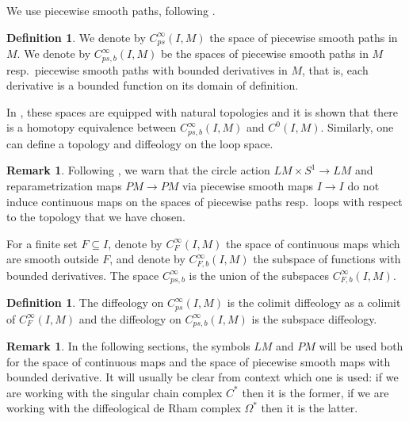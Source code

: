 \documentclass{scrartcl}
\theoremstyle{plain}
\theoremstyle{definition}
\newtheorem{definition}[theorem]{Definition}
\newtheorem{remark}[theorem]{Remark}
\renewcommand{\subset}{\subseteq}
\begin{document}
We use piecewise smooth paths, following \cite{stacey2017smooth}. 
\begin{definition}
    We denote by $C^\infty_{ps}(I, M)$ the space of piecewise smooth paths in $M$. We denote by $C^\infty_{ps, b}(I, M)$ be the spaces of piecewise smooth paths in $M$ resp.~piecewise smooth paths with bounded derivatives in $M$, that is, each derivative is a bounded function on its domain of definition.
\end{definition}
In \cite{stacey2017smooth}, these spaces are equipped with natural topologies and it is shown that there is a homotopy equivalence between $C^\infty_{ps, b}(I, M)$ and $C^0(I, M)$. Similarly, one can define a topology and diffeology on the loop space.
\begin{remark}\label{rmk:noncts-s1-action}
    Following \cite{stacey2017smooth}, we warn that the circle action $LM\times S^1\to LM$ and reparametrization maps $PM\to PM$ via piecewise smooth maps $I\to I$ do not induce continuous maps on the spaces of piecewise paths resp.~loops with respect to the topology that we have chosen. 
\end{remark}


For a finite set $F\subset I$, denote by $C^\infty_F(I, M)$ the space of continuous maps which are smooth outside $F$, and denote by $C^\infty_{F, b}(I, M)$ the subspace of functions with bounded derivatives. The space $C^\infty_{ps, b}$ is the union of the subspaces $C^\infty_{F, b}(I, M)$.
\begin{definition}
    The diffeology on $C^\infty_{ps}(I, M)$ is the colimit diffeology as a colimit of $C^\infty_{F}(I, M)$ and the diffeology on $C^\infty_{ps, b}(I, M)$ is the subspace diffeology. 
\end{definition}

\begin{remark}
    In the following sections, the symbols $LM$ and $PM$ will be used both for the space of continuous maps and the space of piecewise smooth maps with bounded derivative. It will usually be clear from context which one is used: if we are working with the singular chain complex $C^*$ then it is the former, if we are working with the diffeological de Rham complex $\Omega^*$ then it is the latter. 
\end{remark}
\end{document}
